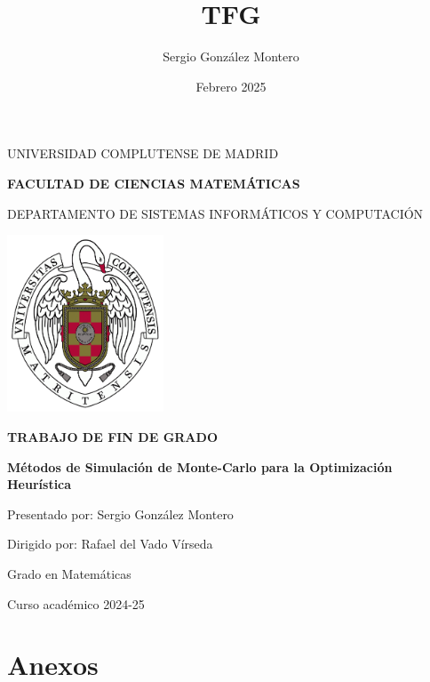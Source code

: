 \documentclass[openany,12pt,a4paper]{book}
\author{Sergio González Montero}
\title{TFG}
\date{Febrero 2025}
\begin{document}
\begin{titlepage}
		\centering
		
		{ \Large UNIVERSIDAD COMPLUTENSE DE MADRID}
		
		{ \Large \textbf{FACULTAD DE CIENCIAS MATEMÁTICAS}}
		\vspace{0.8cm}
		
		{ \large DEPARTAMENTO DE SISTEMAS INFORMÁTICOS Y  COMPUTACIÓN}
		\vspace{1cm}
		
		\vspace{0.6cm}
		

		\includegraphics[width=0.35\textwidth]{Imagenes/ucm.png} 
		\vspace{0.4cm}
		
        {\Large \textbf{TRABAJO DE FIN DE GRADO}}
		
		\vspace{8mm}
        {\huge \bfseries Métodos de Simulación de Monte-Carlo para la Optimización Heurística\par}
		\vspace{1cm}

		{\large Presentado por: Sergio González Montero}
		
		{\large Dirigido por: Rafael del Vado Vírseda}
		
		\vspace{1.5cm}
		{\large Grado en Matemáticas}
		
		{\large Curso académico 2024-25}
\end{titlepage}



\tableofcontents
\thispagestyle{empty}






\medskip

\printbibliography
\chapter*{Anexos}
\appendix

\newpage

\newpage

\end{document}
